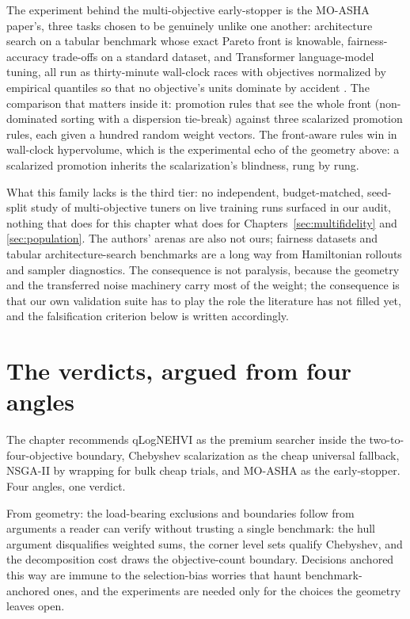 The experiment behind the multi-objective early-stopper is the
MO-ASHA paper's, three tasks chosen to be genuinely unlike one
another: architecture search on a tabular benchmark whose exact
Pareto front is knowable, fairness-accuracy trade-offs on a standard
dataset, and Transformer language-model tuning, all run as
thirty-minute wall-clock races with objectives normalized by
empirical quantiles so that no objective's units dominate by
accident \citep{schmucker2021moasha}. The comparison that matters
inside it: promotion rules that see the whole front (non-dominated
sorting with a dispersion tie-break) against three scalarized
promotion rules, each given a hundred random weight vectors. The
front-aware rules win in wall-clock hypervolume, which is the
experimental echo of the geometry above: a scalarized promotion
inherits the scalarization's blindness, rung by rung.

What this family lacks is the third tier: no independent,
budget-matched, seed-split study of multi-objective tuners on live
training runs surfaced in our audit, nothing that does for this
chapter what \citet{eimer2023hyperparameters} does for
Chapters~\ref{sec:multifidelity} and \ref{sec:population}. The
authors' arenas are also not ours; fairness datasets and tabular
architecture-search benchmarks are a long way from Hamiltonian
rollouts and sampler diagnostics.
The consequence is not paralysis, because the geometry and the
transferred noise machinery carry most of the weight; the
consequence is that our own validation suite has to play the role
the literature has not filled yet, and the falsification criterion
below is written accordingly.

\section{The verdicts, argued from four angles}
\label{sec:mo-angles}

The chapter recommends qLogNEHVI as the premium searcher inside the
two-to-four-objective boundary, Chebyshev scalarization as the cheap
universal fallback, NSGA-II by wrapping for bulk cheap trials, and
MO-ASHA as the early-stopper. Four angles, one verdict.

From geometry: the load-bearing exclusions and boundaries follow
from arguments a reader can verify without trusting a single
benchmark: the hull argument disqualifies weighted sums, the corner
level sets qualify Chebyshev, and the decomposition cost draws the
objective-count boundary. Decisions anchored this way are immune to
the selection-bias worries that haunt benchmark-anchored ones, and
the experiments are needed only for the choices the geometry leaves
open.

